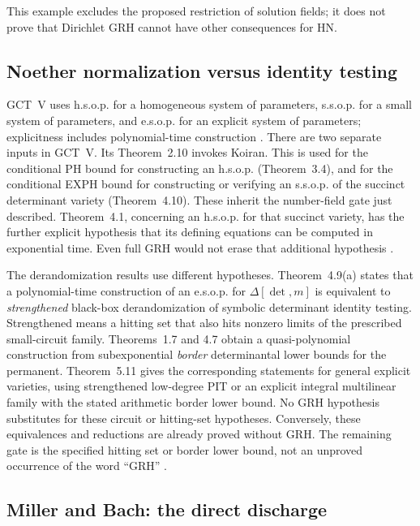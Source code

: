 \documentclass[11pt,a4paper]{article}
\begin{document}
This example excludes the proposed restriction of solution fields;
it does not prove that Dirichlet GRH cannot have other consequences
for HN.

\subsection{Noether normalization versus identity testing}

GCT~V uses h.s.o.p. for a homogeneous system of parameters, s.s.o.p.
for a small system of parameters, and e.s.o.p. for an explicit system
of parameters; explicitness includes polynomial-time construction
\cite[\S1.2]{CGCTV}.
There are two separate inputs in GCT~V.  Its Theorem~2.10 invokes Koiran.
This is used for the conditional PH bound for constructing an h.s.o.p.
(Theorem~3.4), and for the conditional EXPH bound for constructing or
verifying an s.s.o.p. of the succinct determinant variety
(Theorem~4.10).  These inherit the number-field gate just described.
Theorem~4.1, concerning an h.s.o.p. for that succinct variety, has the further
explicit hypothesis that its defining equations can be computed in
exponential time.  Even full GRH would not erase that additional hypothesis
\cite[Theorems~2.10, 3.4, 4.1, 4.10]{CGCTV}.

The derandomization results use different hypotheses.  Theorem~4.9(a) states
that a polynomial-time construction of an e.s.o.p. for
\(\Delta[\det,m]\) is equivalent to \emph{strengthened} black-box
derandomization of symbolic determinant identity testing.  Strengthened
means a hitting set that also hits nonzero limits of the prescribed
small-circuit family.  Theorems~1.7 and 4.7 obtain a quasi-polynomial
construction from subexponential \emph{border} determinantal lower bounds
for the permanent.  Theorem~5.11 gives the corresponding statements for
general explicit varieties, using strengthened low-degree PIT or an
explicit integral multilinear family with the stated arithmetic border
lower bound.  No GRH hypothesis substitutes for these circuit or hitting-set
hypotheses.  Conversely, these equivalences and reductions are already
proved without GRH.  The remaining gate is the specified hitting set or
border lower bound, not an unproved occurrence of the word ``GRH''
\cite[Theorems~1.7, 4.7, 4.9, 5.11]{CGCTV}.

\subsection{Miller and Bach: the direct discharge}
\end{document}
